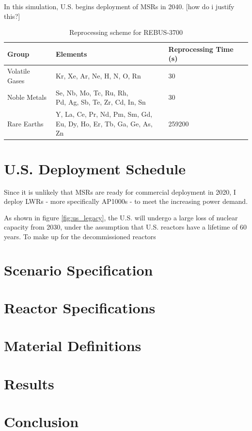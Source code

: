 In this simulation, U.S. begins deployment of \glspl{MSR}
in 2040. [how do i justify this?]


\begin{table}[h]
	\centering
	\caption{Reprocessing scheme for REBUS-3700}
	\label{tab:rebus_reproc}
	\begin{tabular}{lll}
		\hline
		Group & Elements & Reprocessing Time (s) \\
		\hline
		Volatile Gases & Kr, Xe, Ar, Ne, H, N, O, Rn & 30 \\
		Noble Metals & \shortstack{Se, Nb, Mo, Tc, Ru, Rh,\\ Pd, Ag, Sb, Te, Zr, Cd, In, Sn} & 30 \\
		Rare Earths & \shortstack{Y, La, Ce, Pr, Nd, Pm, Sm, Gd, \\ Eu, Dy, Ho, Er, Tb, Ga, Ge, As, Zn} & 259200 \\
		\hline
	\end{tabular}
\end{table}



\section{U.S. Deployment Schedule}



Since it is unlikely that \glspl{MSR} are ready for
commercial deployment in 2020, I deploy \glspl{LWR}
- more specifically AP1000s - 
to meet the increasing power demand.

As shown in figure \ref{fig:us_legacy}, the U.S. will
undergo a large loss of nuclear capacity from 2030, under the
assumption that U.S. reactors have a lifetime of 60 years.
To make up for the decommissioned reactors


\section{Scenario Specification}

\section{Reactor Specifications}

\section{Material Definitions}

\section{Results}

\section{Conclusion}